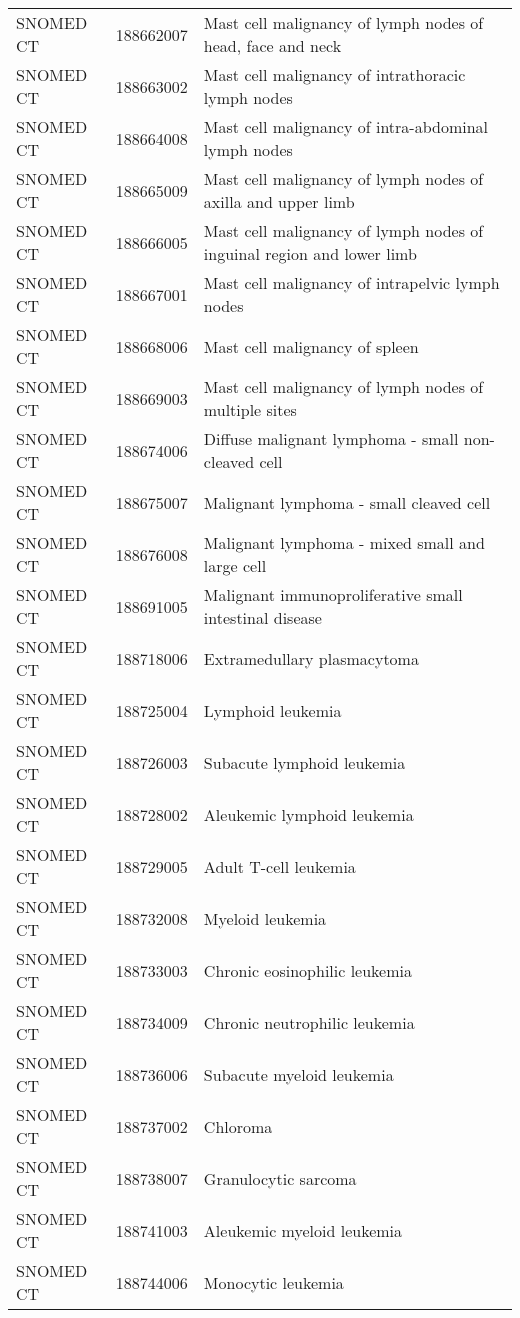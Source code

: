 \begin{longtable}{p{}p{}p{}}
  SNOMED CT & 188662007 & Mast cell malignancy of lymph nodes of head, face and neck \\ 
  SNOMED CT & 188663002 & Mast cell malignancy of intrathoracic lymph nodes \\ 
  SNOMED CT & 188664008 & Mast cell malignancy of intra-abdominal lymph nodes \\ 
  SNOMED CT & 188665009 & Mast cell malignancy of lymph nodes of axilla and upper limb \\ 
  SNOMED CT & 188666005 & Mast cell malignancy of lymph nodes of inguinal region and lower limb \\ 
  SNOMED CT & 188667001 & Mast cell malignancy of intrapelvic lymph nodes \\ 
  SNOMED CT & 188668006 & Mast cell malignancy of spleen \\ 
  SNOMED CT & 188669003 & Mast cell malignancy of lymph nodes of multiple sites \\ 
  SNOMED CT & 188674006 & Diffuse malignant lymphoma - small non-cleaved cell \\ 
  SNOMED CT & 188675007 & Malignant lymphoma - small cleaved cell \\ 
  SNOMED CT & 188676008 & Malignant lymphoma - mixed small and large cell \\ 
  SNOMED CT & 188691005 & Malignant immunoproliferative small intestinal disease \\ 
  SNOMED CT & 188718006 & Extramedullary plasmacytoma \\ 
  SNOMED CT & 188725004 & Lymphoid leukemia \\ 
  SNOMED CT & 188726003 & Subacute lymphoid leukemia \\ 
  SNOMED CT & 188728002 & Aleukemic lymphoid leukemia \\ 
  SNOMED CT & 188729005 & Adult T-cell leukemia \\ 
  SNOMED CT & 188732008 & Myeloid leukemia \\ 
  SNOMED CT & 188733003 & Chronic eosinophilic leukemia \\ 
  SNOMED CT & 188734009 & Chronic neutrophilic leukemia \\ 
  SNOMED CT & 188736006 & Subacute myeloid leukemia \\ 
  SNOMED CT & 188737002 & Chloroma \\ 
  SNOMED CT & 188738007 & Granulocytic sarcoma \\ 
  SNOMED CT & 188741003 & Aleukemic myeloid leukemia \\ 
  SNOMED CT & 188744006 & Monocytic leukemia \\ 

\end{longtable}
